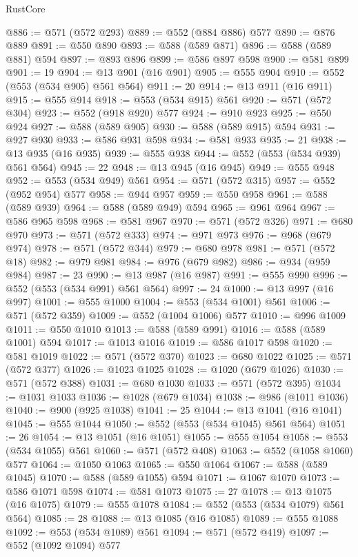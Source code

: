 \begin{lexlean}{RustCore}
\begin{coremodule}
@886 := @571 (@572 @293)
@889 := @552 (@884 @886) @577
@890 := @876 @889
@891 := @550 @890
@893 := @588 (@589 @871)
@896 := @588 (@589 @881) @594
@897 := @893 @896
@899 := @586 @897 @598
@900 := @581 @899
@901 := 19
@904 := @13 @901 (@16 @901)
@905 := @555 @904
@910 := @552 (@553 (@534 @905) @561 @564)
@911 := 20
@914 := @13 @911 (@16 @911)
@915 := @555 @914
@918 := @553 (@534 @915) @561
@920 := @571 (@572 @304)
@923 := @552 (@918 @920) @577
@924 := @910 @923
@925 := @550 @924
@927 := @588 (@589 @905)
@930 := @588 (@589 @915) @594
@931 := @927 @930
@933 := @586 @931 @598
@934 := @581 @933
@935 := 21
@938 := @13 @935 (@16 @935)
@939 := @555 @938
@944 := @552 (@553 (@534 @939) @561 @564)
@945 := 22
@948 := @13 @945 (@16 @945)
@949 := @555 @948
@952 := @553 (@534 @949) @561
@954 := @571 (@572 @315)
@957 := @552 (@952 @954) @577
@958 := @944 @957
@959 := @550 @958
@961 := @588 (@589 @939)
@964 := @588 (@589 @949) @594
@965 := @961 @964
@967 := @586 @965 @598
@968 := @581 @967
@970 := @571 (@572 @326)
@971 := @680 @970
@973 := @571 (@572 @333)
@974 := @971 @973
@976 := @968 (@679 @974)
@978 := @571 (@572 @344)
@979 := @680 @978
@981 := @571 (@572 @18)
@982 := @979 @981
@984 := @976 (@679 @982)
@986 := @934 (@959 @984)
@987 := 23
@990 := @13 @987 (@16 @987)
@991 := @555 @990
@996 := @552 (@553 (@534 @991) @561 @564)
@997 := 24
@1000 := @13 @997 (@16 @997)
@1001 := @555 @1000
@1004 := @553 (@534 @1001) @561
@1006 := @571 (@572 @359)
@1009 := @552 (@1004 @1006) @577
@1010 := @996 @1009
@1011 := @550 @1010
@1013 := @588 (@589 @991)
@1016 := @588 (@589 @1001) @594
@1017 := @1013 @1016
@1019 := @586 @1017 @598
@1020 := @581 @1019
@1022 := @571 (@572 @370)
@1023 := @680 @1022
@1025 := @571 (@572 @377)
@1026 := @1023 @1025
@1028 := @1020 (@679 @1026)
@1030 := @571 (@572 @388)
@1031 := @680 @1030
@1033 := @571 (@572 @395)
@1034 := @1031 @1033
@1036 := @1028 (@679 @1034)
@1038 := @986 (@1011 @1036)
@1040 := @900 (@925 @1038)
@1041 := 25
@1044 := @13 @1041 (@16 @1041)
@1045 := @555 @1044
@1050 := @552 (@553 (@534 @1045) @561 @564)
@1051 := 26
@1054 := @13 @1051 (@16 @1051)
@1055 := @555 @1054
@1058 := @553 (@534 @1055) @561
@1060 := @571 (@572 @408)
@1063 := @552 (@1058 @1060) @577
@1064 := @1050 @1063
@1065 := @550 @1064
@1067 := @588 (@589 @1045)
@1070 := @588 (@589 @1055) @594
@1071 := @1067 @1070
@1073 := @586 @1071 @598
@1074 := @581 @1073
@1075 := 27
@1078 := @13 @1075 (@16 @1075)
@1079 := @555 @1078
@1084 := @552 (@553 (@534 @1079) @561 @564)
@1085 := 28
@1088 := @13 @1085 (@16 @1085)
@1089 := @555 @1088
@1092 := @553 (@534 @1089) @561
@1094 := @571 (@572 @419)
@1097 := @552 (@1092 @1094) @577

\end{coremodule}
\end{lexlean}
